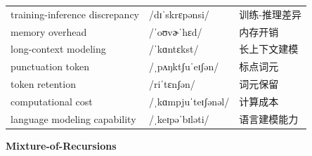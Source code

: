 \documentclass[UTF8,12pt,a4paper]{ctexart}
\providecommand{\zh}[1]{#1}
\begin{document}
\begin{tabular*}{\textwidth}{@{\extracolsep{\fill}}lll@{}}
training-inference discrepancy & {\ipafont /dɪˈskrɛpənsi/} & \zh{训练-推理差异} \\
memory overhead & {\ipafont /ˈoʊvɚˈhɛd/} & \zh{内存开销} \\
long-context modeling & {\ipafont /ˈkɑntɛkst/} & \zh{长上下文建模} \\
punctuation token & {\ipafont /ˌpʌŋktʃuˈeɪʃən/} & \zh{标点词元} \\
token retention & {\ipafont /riˈtɛnʃən/} & \zh{词元保留} \\
computational cost & {\ipafont /ˌkɑmpjuˈteɪʃənəl/} & \zh{计算成本} \\
language modeling capability & {\ipafont /ˌkeɪpəˈbɪləti/} & \zh{语言建模能力} \\
\bottomrule
\end{tabular*}

\newpage

\begin{center}
    {\Large\bfseries Mixture-of-Recursions}
\end{center}
\end{document}
